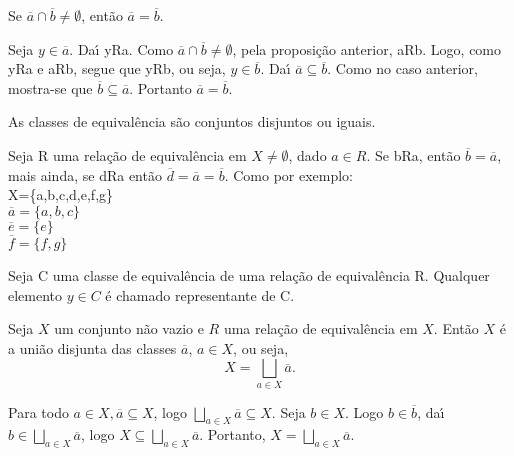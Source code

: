 \begin{proposicao}
	Se  $\overline{a}\cap\overline{b}\neq\emptyset$, ent{\~a}o $\overline{a}=\overline{b}$.
\end{proposicao}
\begin{prova}
	Seja $y\in \overline{a}$. Da{\'\i} yRa. Como $\overline{a}\cap\overline{b}\neq\emptyset$, pela proposi{\c c}{\~a}o anterior, aRb. Logo, como yRa e aRb, segue que yRb, ou seja, $y\in\overline{b}$. Da{\'\i} $\overline{a}\subseteq\overline{b}$. Como no caso anterior, mostra-se que $\overline{b}\subseteq\overline{a}$. Portanto $\overline{a}=\overline{b}$.
\end{prova}


\begin{corolario} As classes de equival{\^e}ncia s{\~a}o conjuntos disjuntos ou iguais.\end{corolario}

Seja R uma rela{\c c}{\~a}o de equival{\^e}ncia em $X\neq\emptyset$, dado $a\in R$. Se bRa, ent{\~a}o $\overline{b}=\overline{a}$, mais ainda, se dRa ent{\~a}o $\overline{d}=\overline{a}=\overline{b}$. Como por exemplo:\\
X=\{a,b,c,d,e,f,g\}\\
$\overline{a}=\{a,b,c\}$\\
$\overline{e}=\{e\}$\\
$\overline{f}=\{f,g\}$

\begin{definicao} Seja C uma classe de equival{\^e}ncia de uma rela{\c c}{\~a}o de equival{\^e}ncia R. Qualquer elemento $y\in C$ {\'e} chamado representante de C.\end{definicao}

\begin{proposicao}
	Seja $X$ um conjunto n{\~a}o vazio e $R$ uma rela{\c c}{\~a}o de equival{\^e}ncia em $X$. Ent{\~a}o $X$ {\'e} a uni{\~a}o disjunta das classes $\overline{a}$, $a \in X$, ou seja,
	\[
		X = \displaystyle\bigsqcup_{a\in X}\overline{a}.
	\]
\end{proposicao}
\begin{prova}
	Para todo $a\in X, \overline{a}\subseteq X$, logo $\displaystyle\bigsqcup_{a\in X}\overline{a}\subseteq X$. Seja $b\in X$. Logo $b\in\overline{b}$, da{\'\i} $b\in \displaystyle\bigsqcup_{a\in X}\overline{a}$, logo $X\subseteq\displaystyle\bigsqcup_{a\in X}\overline{a}$. Portanto, $X=\displaystyle\bigsqcup_{a\in X}\overline{a}$.
\end{prova}

